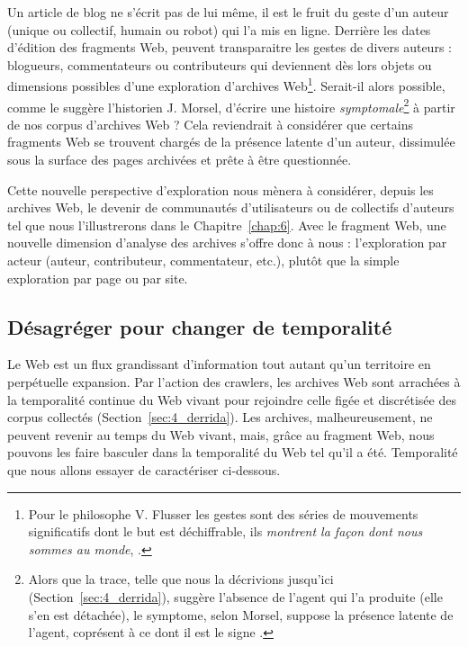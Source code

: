 \documentclass[symmetric,justified,marginals=raggedouter]{tufte-book}
\begin{document}
Un article de blog ne s'écrit pas de lui même, il est le fruit du geste d'un auteur (unique ou collectif, humain ou robot) qui l'a mis en ligne. Derrière les dates d'édition des fragments Web, peuvent transparaitre les gestes de divers auteurs : blogueurs, commentateurs ou contributeurs qui deviennent dès lors objets ou dimensions possibles d'une exploration d'archives Web\footnote{\RaggedOuter Pour le philosophe V. Flusser les gestes sont des séries de mouvements significatifs dont le but est déchiffrable, ils \og\textit{montrent la façon dont nous sommes au monde}\fg{}, \citep[p.319]{flusser_les_2014}.}. Serait-il alors possible, comme le suggère l'historien J. Morsel, d'écrire une histoire \textit{symptomale}\footnote{\RaggedOuter Alors que la trace, telle que nous la décrivions jusqu'ici (Section~\ref{sec:4_derrida}), suggère l'absence de l'agent qui l'a produite (elle s'en est détachée), le symptome, selon Morsel, suppose la présence latente de l'agent, coprésent à ce dont il est le signe \citep{morsel_traces?_2016}.} \citep{morsel_traces?_2016} à partir de nos corpus d'archives Web ? Cela reviendrait à considérer que certains fragments Web se trouvent chargés de la présence latente d'un auteur, dissimulée sous la surface des pages archivées et prête à être questionnée. 

Cette nouvelle perspective d'exploration nous mènera à considérer, depuis les archives Web, le devenir de communautés d'utilisateurs ou de collectifs d'auteurs tel que nous l'illustrerons dans le Chapitre~\ref{chap:6}. Avec le fragment Web, une nouvelle dimension d'analyse des archives s'offre donc à nous : l'exploration par acteur (auteur, contributeur, commentateur, etc.), plutôt que la simple exploration par page ou par site.

\subsection{Désagréger pour changer de temporalité}

\noindent Le Web est un flux grandissant d'information tout autant qu'un territoire en perpétuelle expansion. Par l'action des crawlers, les archives Web sont arrachées à la temporalité continue du Web vivant pour rejoindre celle figée et discrétisée des corpus collectés (Section~\ref{sec:4_derrida}). Les archives, malheureusement, ne peuvent revenir au temps du Web vivant, mais, grâce au fragment Web, nous pouvons les faire basculer dans la temporalité du Web tel qu'il a été. Temporalité que nous allons essayer de caractériser ci-dessous.  
\end{document}
